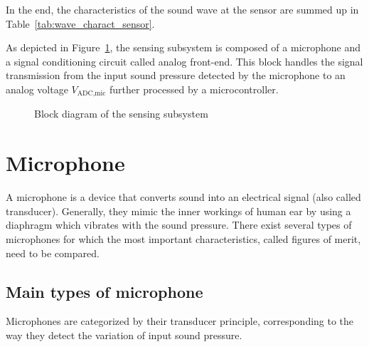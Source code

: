 \documentclass{EPL-master-thesis-covers-EN}
\newcommand{\te}[1]{\textrm{#1}}
\begin{document}
In the end, the characteristics of the sound wave at the sensor are summed up in Table~\ref{tab:wave_charact_sensor}.

\begin{table}[H]
\centering
{}
\caption{Sound wave characteristics at the sensor}
\label{tab:wave_charact_sensor}
\end{table}


As depicted in Figure~\ref{fig:sensing_subsystem}, the sensing subsystem is composed of a microphone and a signal conditioning circuit called analog front-end. This block handles the signal transmission from the input sound pressure detected by the microphone to an analog voltage $V_{\te{ADC,mic}}$ further processed by a microcontroller.

\begin{figure}[H]
\centering
{}
\caption{Block diagram of the sensing subsystem}
\label{fig:sensing_subsystem}
\end{figure}

\section{Microphone}

A microphone is a device that converts sound into an electrical signal (also called transducer). Generally, they mimic the inner workings of human ear by using a diaphragm which vibrates with the sound pressure. There exist several types of microphones for which the most important characteristics, called figures of merit, need to be compared.


\subsection*{Main types of microphone}

Microphones are categorized by their transducer principle, corresponding to the way they detect the variation of input sound pressure.
\end{document}
